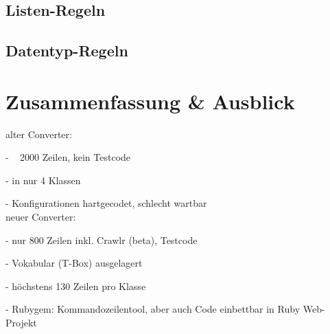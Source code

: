 \documentclass[runningheads,a4paper]{llncs}
\begin{document}
\subsection{Listen-Regeln}
\subsection{Datentyp-Regeln}



\section{Zusammenfassung \& Ausblick}
alter Converter:

- ~ 2000 Zeilen, kein Testcode

- in nur 4 Klassen

- Konfigurationen hartgecodet, schlecht wartbar
\\
neuer Converter:

- nur 800 Zeilen inkl. Crawlr (beta), Testcode

- Vokabular (T-Box) ausgelagert

- höchstens 130 Zeilen pro Klasse

- Rubygem: Kommandozeilentool, aber auch Code einbettbar in Ruby Web-Projekt


\nocite{url_dl_primer}



\end{document}
